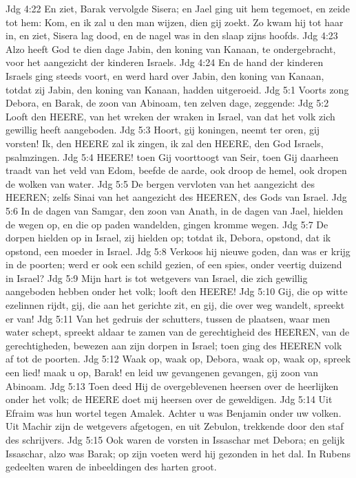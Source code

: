 Jdg 4:22  En ziet, Barak vervolgde Sisera; en Jael ging uit hem tegemoet, en zeide tot hem: Kom, en ik zal u den man wijzen, dien gij zoekt. Zo kwam hij tot haar in, en ziet, Sisera lag dood, en de nagel was in den slaap zijns hoofds.
Jdg 4:23  Alzo heeft God te dien dage Jabin, den koning van Kanaan, te ondergebracht, voor het aangezicht der kinderen Israels.
Jdg 4:24  En de hand der kinderen Israels ging steeds voort, en werd hard over Jabin, den koning van Kanaan, totdat zij Jabin, den koning van Kanaan, hadden uitgeroeid.
Jdg 5:1  Voorts zong Debora, en Barak, de zoon van Abinoam, ten zelven dage, zeggende:
Jdg 5:2  Looft den HEERE, van het wreken der wraken in Israel, van dat het volk zich gewillig heeft aangeboden.
Jdg 5:3  Hoort, gij koningen, neemt ter oren, gij vorsten! Ik, den HEERE zal ik zingen, ik zal den HEERE, den God Israels, psalmzingen.
Jdg 5:4  HEERE! toen Gij voorttoogt van Seir, toen Gij daarheen traadt van het veld van Edom, beefde de aarde, ook droop de hemel, ook dropen de wolken van water.
Jdg 5:5  De bergen vervloten van het aangezicht des HEEREN; zelfs Sinai van het aangezicht des HEEREN, des Gods van Israel.
Jdg 5:6  In de dagen van Samgar, den zoon van Anath, in de dagen van Jael, hielden de wegen op, en die op paden wandelden, gingen kromme wegen.
Jdg 5:7  De dorpen hielden op in Israel, zij hielden op; totdat ik, Debora, opstond, dat ik opstond, een moeder in Israel.
Jdg 5:8  Verkoos hij nieuwe goden, dan was er krijg in de poorten; werd er ook een schild gezien, of een spies, onder veertig duizend in Israel?
Jdg 5:9  Mijn hart is tot wetgevers van Israel, die zich gewillig aangeboden hebben onder het volk; looft den HEERE!
Jdg 5:10  Gij, die op witte ezelinnen rijdt, gij, die aan het gerichte zit, en gij, die over weg wandelt, spreekt er van!
Jdg 5:11  Van het gedruis der schutters, tussen de plaatsen, waar men water schept, spreekt aldaar te zamen van de gerechtigheid des HEEREN, van de gerechtigheden, bewezen aan zijn dorpen in Israel; toen ging des HEEREN volk af tot de poorten.
Jdg 5:12  Waak op, waak op, Debora, waak op, waak op, spreek een lied! maak u op, Barak! en leid uw gevangenen gevangen, gij zoon van Abinoam.
Jdg 5:13  Toen deed Hij de overgeblevenen heersen over de heerlijken onder het volk; de HEERE doet mij heersen over de geweldigen.
Jdg 5:14  Uit Efraim was hun wortel tegen Amalek. Achter u was Benjamin onder uw volken. Uit Machir zijn de wetgevers afgetogen, en uit Zebulon, trekkende door den staf des schrijvers.
Jdg 5:15  Ook waren de vorsten in Issaschar met Debora; en gelijk Issaschar, alzo was Barak; op zijn voeten werd hij gezonden in het dal. In Rubens gedeelten waren de inbeeldingen des harten groot.
